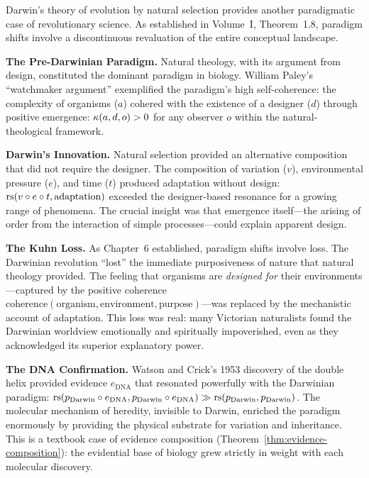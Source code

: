 \begin{remark}
Darwin's theory of evolution by natural selection provides another paradigmatic
case of revolutionary science. As established in Volume~I, Theorem~1.8, paradigm
shifts involve a discontinuous revaluation of the entire conceptual landscape.

\textbf{The Pre-Darwinian Paradigm.} Natural theology, with its argument from
design, constituted the dominant paradigm in biology. William Paley's ``watchmaker
argument'' exemplified the paradigm's high self-coherence: the complexity of
organisms ($a$) cohered with the existence of a designer ($d$) through
positive emergence: $\kappa(a, d, o) > 0$ for any observer $o$ within the
natural-theological framework.

\textbf{Darwin's Innovation.} Natural selection provided an alternative
composition that did not require the designer. The composition of variation ($v$),
environmental pressure ($e$), and time ($t$) produced adaptation without design:
$\mathrm{rs}(v \circ e \circ t, \text{adaptation})$ exceeded the designer-based
resonance for a growing range of phenomena. The crucial insight was that
emergence itself---the arising of order from the interaction of simple
processes---could explain apparent design.

\textbf{The Kuhn Loss.} As Chapter~6 established, paradigm shifts involve loss.
The Darwinian revolution ``lost'' the immediate purposiveness of nature that
natural theology provided. The feeling that organisms are \emph{designed for}
their environments---captured by the positive coherence $\mathrm{coherence}(
\text{organism}, \text{environment}, \text{purpose})$---was replaced by the
mechanistic account of adaptation. This loss was real: many Victorian naturalists
found the Darwinian worldview emotionally and spiritually impoverished, even as
they acknowledged its superior explanatory power.

\textbf{The DNA Confirmation.} Watson and Crick's 1953 discovery of the double
helix provided evidence $e_{\text{DNA}}$ that resonated powerfully with the
Darwinian paradigm: $\mathrm{rs}(p_{\text{Darwin}} \circ e_{\text{DNA}},
p_{\text{Darwin}} \circ e_{\text{DNA}}) \gg \mathrm{rs}(p_{\text{Darwin}},
p_{\text{Darwin}})$. The molecular mechanism of heredity, invisible to Darwin,
enriched the paradigm enormously by providing the physical substrate for
variation and inheritance. This is a textbook case of evidence composition
(Theorem~\ref{thm:evidence-composition}): the evidential base of biology grew
strictly in weight with each molecular discovery.
\end{remark}

